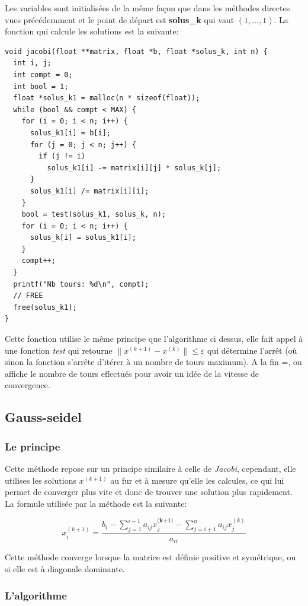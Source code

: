 \documentclass[a4paper]{article}
\begin{document}
Les variables sont initialisées de la même façon que dans les méthodes directes
vues précédemment et le point de départ est \textbf{solus\_k} qui vaut $(1,
\dots, 1)$. La fonction qui calcule les solutions est la suivante:

\begin{lstlisting}
void jacobi(float **matrix, float *b, float *solus_k, int n) {
  int i, j;
  int compt = 0;
  int bool = 1;
  float *solus_k1 = malloc(n * sizeof(float));
  while (bool && compt < MAX) {
    for (i = 0; i < n; i++) {
      solus_k1[i] = b[i];
      for (j = 0; j < n; j++) {
        if (j != i)
          solus_k1[i] -= matrix[i][j] * solus_k[j];
      }
      solus_k1[i] /= matrix[i][i];
    }
    bool = test(solus_k1, solus_k, n);
    for (i = 0; i < n; i++) {
      solus_k[i] = solus_k1[i];
    }
    compt++;
  }
  printf("Nb tours: %d\n", compt);
  // FREE
  free(solus_k1);
}
\end{lstlisting}

Cette fonction utilise le même principe que l'algorithme ci dessus, elle
fait appel à une fonction \textit{test} qui retourne $\parallel x^{(k+1)} -
x^{(k)} \parallel \leqslant \varepsilon$ qui détermine l'arrêt (où sinon la
fonction s'arrête d'itérer à un nombre de tours maximum). A la fin =, on affiche
le nombre de tours effectués pour avoir un idée de la vitesse de convergence.

\subsection{Gauss-seidel}

\subsubsection{Le principe}

Cette méthode repose sur un principe similaire à celle de \textit{Jacobi},
cependant, elle utilises les solutions $x^{(k+1)}$ au fur et à mesure qu'elle
les calcules, ce qui lui permet de converger plus vite et donc de trouver une
solution plus rapidement. La formule utilisée par la méthode est la suivante:

\[x_{i}^{(k+1)} = \frac{b_{i} - \sum_{j=1}^{i-1}a_{ij}x_{j}^{\textbf{(k+1)}} -
  \sum_{j=i+1}^{n}a_{ij}x_{j}^{(k)}}{a_{ii}}\]

Cette méthode converge lorsque la matrice est définie positive et symétrique, ou
si elle est à diagonale dominante.

\subsubsection{L'algorithme}
\end{document}
